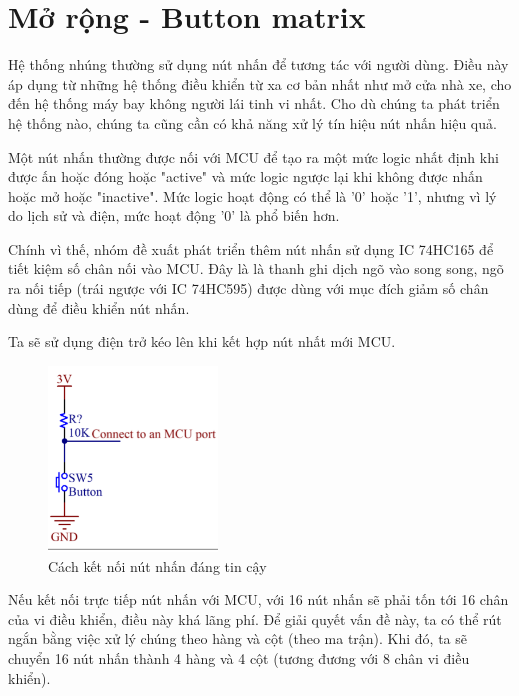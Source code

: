 \section{Mở rộng - Button matrix}
Hệ thống nhúng thường sử dụng nút nhấn để tương tác với người dùng. Điều này áp dụng từ những hệ thống điều khiển từ xa cơ bản nhất như mở cửa nhà xe, cho đến hệ thống máy bay không người lái tinh vi nhất. Cho dù chúng ta phát triển hệ thống nào, chúng ta cũng cần có khả năng xử lý tín hiệu nút nhấn hiệu quả.

Một nút nhấn thường được nối với MCU để tạo ra một mức logic nhất định khi được ấn hoặc đóng hoặc "active" và mức logic ngược lại khi không được nhấn hoặc mở hoặc "inactive". Mức logic hoạt động có thể là '0' hoặc '1', nhưng vì lý do lịch sử và điện, mức hoạt động '0' là phổ biến hơn.

Chính vì thế, nhóm đề xuất phát triển thêm nút nhấn sử dụng IC 74HC165 để tiết kiệm số chân nối vào MCU. Đây là là thanh ghi dịch ngõ vào song song, ngõ ra nối tiếp (trái ngược với IC 74HC595) được dùng với mục đích giảm số chân dùng để điều khiển nút nhấn.

Ta sẽ sử dụng điện trở kéo lên khi kết hợp nút nhất mới MCU.

\begin{figure}[!htbp]
    \centering
    \includegraphics[width=0.4\textwidth]{graphics/button_sche.PNG}
    \caption{Cách kết nối nút nhấn đáng tin cậy}
\end{figure}

Nếu kết nối trực tiếp nút nhấn với MCU, với 16 nút nhấn sẽ phải tốn tới 16 chân của vi điều khiển, điều này khá lãng phí. Để giải quyết vấn đề này, ta có thể rút ngắn bằng việc xử lý chúng theo hàng và cột (theo ma trận). Khi đó, ta sẽ chuyển 16 nút nhấn thành 4 hàng và 4 cột (tương đương với 8 chân vi điều khiển).

